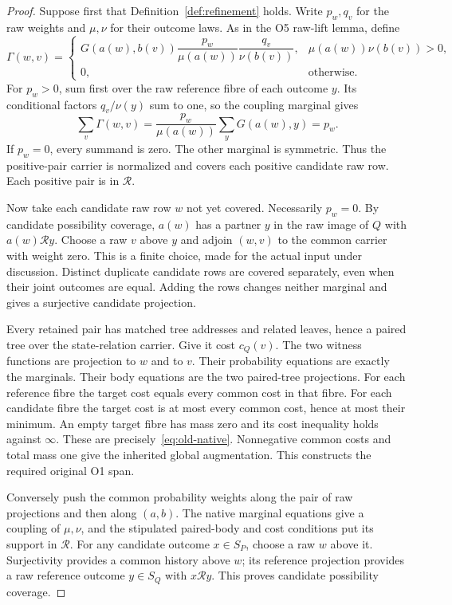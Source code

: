 \documentclass[11pt,a4paper]{article}
\theoremstyle{definition}
\begin{document}
\begin{proof}
Suppose first that Definition~\ref{def:refinement} holds. Write $p_w,q_v$
for the raw weights and $\mu,\nu$ for their outcome laws. As in the
O5 raw-lift lemma, define
\begin{equation}\label{eq:raw-lift}
 \Gamma(w,v)=
 \begin{cases}
 G(a(w),b(v))\dfrac{p_w}{\mu(a(w))}\dfrac{q_v}{\nu(b(v))},
       &\mu(a(w))\nu(b(v))>0,\\[5pt]
 0,&\text{otherwise}.
 \end{cases}
\end{equation}
For $p_w>0$, sum first over the raw reference fibre of each outcome $y$.
Its conditional factors $q_v/\nu(y)$ sum to one, so the coupling
marginal gives
\[
 \sum_v\Gamma(w,v)
    =\frac{p_w}{\mu(a(w))}\sum_yG(a(w),y)=p_w.
\]
If $p_w=0$, every summand is zero. The other marginal is symmetric.
Thus the positive-pair carrier is normalized and covers each positive
candidate raw row. Each positive pair is in $\mathcal R$.

Now take each candidate raw row $w$ not yet covered. Necessarily $p_w=0$.
By candidate possibility coverage, $a(w)$ has a partner $y$ in the raw
image of $Q$ with $a(w)\mathcal R y$. Choose a raw $v$ above $y$ and
adjoin $(w,v)$ to the common carrier with weight zero. This is a finite
choice, made for the actual input under discussion. Distinct duplicate
candidate rows are covered separately, even when their joint outcomes
are equal. Adding the rows changes neither marginal and gives a
surjective candidate projection.

Every retained pair has matched tree addresses and related leaves, hence
a paired tree over the state-relation carrier. Give it cost $c_Q(v)$.
The two witness functions are projection to $w$ and to $v$. Their
probability equations are exactly the marginals. Their body equations
are the two paired-tree projections. For each reference fibre the target
cost equals every common cost in that fibre. For each candidate fibre
the target cost is at most every common cost, hence at most their minimum.
An empty target fibre has mass zero and its cost inequality holds against
$\infty$. These are precisely~\eqref{eq:old-native}. Nonnegative common
costs and total mass one give the inherited global augmentation. This
constructs the required original O1 span.

Conversely push the common probability weights along the pair of raw
projections and then along $(a,b)$. The native marginal equations give
a coupling of $\mu,\nu$, and the stipulated paired-body and cost
conditions put its support in $\mathcal R$. For any candidate outcome
$x\in S_P$, choose a raw $w$ above it. Surjectivity provides a common
history above $w$; its reference projection provides a raw reference
outcome $y\in S_Q$ with $x\mathcal R y$. This proves candidate
possibility coverage.
\end{proof}
\end{document}
